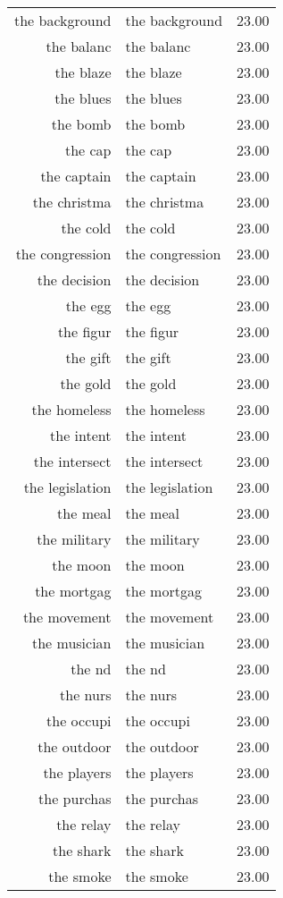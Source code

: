 \begin{table}[ht]
\begin{tabular}{rlr}
  the background & the background & 23.00 \\ 
  the balanc & the balanc & 23.00 \\ 
  the blaze & the blaze & 23.00 \\ 
  the blues & the blues & 23.00 \\ 
  the bomb & the bomb & 23.00 \\ 
  the cap & the cap & 23.00 \\ 
  the captain & the captain & 23.00 \\ 
  the christma & the christma & 23.00 \\ 
  the cold & the cold & 23.00 \\ 
  the congression & the congression & 23.00 \\ 
  the decision & the decision & 23.00 \\ 
  the egg & the egg & 23.00 \\ 
  the figur & the figur & 23.00 \\ 
  the gift & the gift & 23.00 \\ 
  the gold & the gold & 23.00 \\ 
  the homeless & the homeless & 23.00 \\ 
  the intent & the intent & 23.00 \\ 
  the intersect & the intersect & 23.00 \\ 
  the legislation & the legislation & 23.00 \\ 
  the meal & the meal & 23.00 \\ 
  the military & the military & 23.00 \\ 
  the moon & the moon & 23.00 \\ 
  the mortgag & the mortgag & 23.00 \\ 
  the movement & the movement & 23.00 \\ 
  the musician & the musician & 23.00 \\ 
  the nd & the nd & 23.00 \\ 
  the nurs & the nurs & 23.00 \\ 
  the occupi & the occupi & 23.00 \\ 
  the outdoor & the outdoor & 23.00 \\ 
  the players & the players & 23.00 \\ 
  the purchas & the purchas & 23.00 \\ 
  the relay & the relay & 23.00 \\ 
  the shark & the shark & 23.00 \\ 
  the smoke & the smoke & 23.00 \\ 

\end{tabular}
\end{table}
